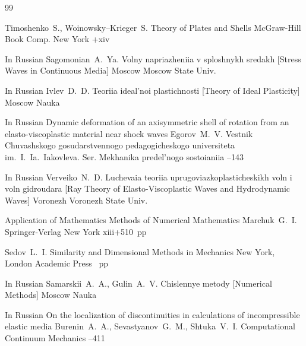 \begin{thebibliography}{99}

\by Timoshenko~S., Woinowsky--Krieger~S.
\book Theory of Plates and Shells
\publ McGraw-Hill Book Comp.
\publaddr New York
+xiv

\lang In Russian
\by Sagomonian~A.~Ya.
\book Volny napriazheniia v sploshnykh sredakh \rm [Stress Waves in Continuous Media]
\publaddr Moscow
\publ Moscow State Univ.


\lang In Russian
\by Ivlev~D.~D.
\book Teoriia ideal'noi plastichnosti \rm [Theory of Ideal Plasticity]
\publaddr Moscow 
\publ Nauka

\lang In Russian
\paper Dynamic deformation of an axisymmetric shell of rotation from an elasto-viscoplastic material near shock waves
\by    Egorov~M.~V.
\jour  Vestnik Chuvashskogo gosudarstvennogo pedagogicheskogo universiteta im.~I.~Ia.~Iakovleva. Ser. Mekhanika predel'nogo sostoianiia
--143

\lang In Russian
\by Verveiko~N.~D.
\book Luchevaia teoriia uprugoviazkoplasticheskikh voln i voln gidroudara \rm [Ray  Theory  of  Elasto-Viscoplastic  Waves  and  Hydrodynamic  Waves]
\publaddr Voronezh
\publ Voronezh State Univ.


\serial Application of Mathematics
\book Methods of Numerical Mathematics
\by Marchuk~G.~I.
\publaddr Springer-Verlag
\publ New York
\totalpages xiii+510~pp \nofrills
{}


\by Sedov~L.~I.
\book Similarity and Dimensional Methods in Mechanics
\publaddr New York, London
\publ Academic Press
~pp \nofrills 
{}



\lang In Russian
\by Samarskii~A.~A., Gulin~A.~V.
\book Chislennye metody \rm [Numerical Methods]
\publaddr Moscow
\publ Nauka

\lang In Russian
\paper On the localization of discontinuities in calculations of incompressible elastic media 
\by Burenin~A.~A., Sevastyanov~G.~M., Shtuka~V.~I.
\jour Computational Continuum Mechanics 
--411 


\end{thebibliography}
